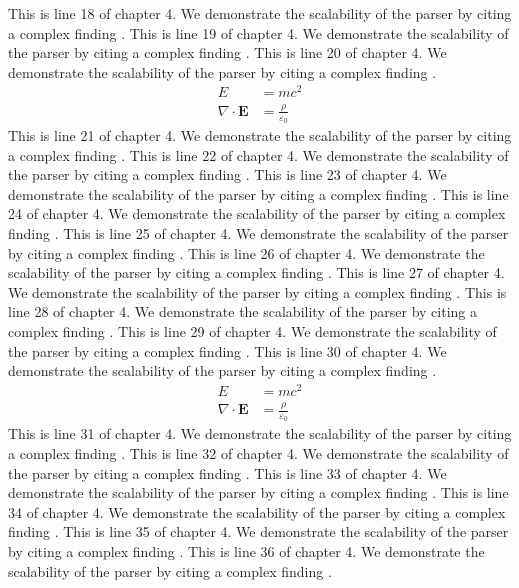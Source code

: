 This is line 18 of chapter 4. We demonstrate the scalability of the parser by citing a complex finding \cite{ref4_18}.
This is line 19 of chapter 4. We demonstrate the scalability of the parser by citing a complex finding \cite{ref4_19}.
This is line 20 of chapter 4. We demonstrate the scalability of the parser by citing a complex finding \cite{ref4_20}.
\begin{align*}
  E &= mc^2 \\
  \nabla \cdot \mathbf{E} &= \frac{\rho}{\varepsilon_0}
\end{align*}
This is line 21 of chapter 4. We demonstrate the scalability of the parser by citing a complex finding \cite{ref4_21}.
This is line 22 of chapter 4. We demonstrate the scalability of the parser by citing a complex finding \cite{ref4_22}.
This is line 23 of chapter 4. We demonstrate the scalability of the parser by citing a complex finding \cite{ref4_23}.
This is line 24 of chapter 4. We demonstrate the scalability of the parser by citing a complex finding \cite{ref4_24}.
This is line 25 of chapter 4. We demonstrate the scalability of the parser by citing a complex finding \cite{ref4_25}.
This is line 26 of chapter 4. We demonstrate the scalability of the parser by citing a complex finding \cite{ref4_26}.
This is line 27 of chapter 4. We demonstrate the scalability of the parser by citing a complex finding \cite{ref4_27}.
This is line 28 of chapter 4. We demonstrate the scalability of the parser by citing a complex finding \cite{ref4_28}.
This is line 29 of chapter 4. We demonstrate the scalability of the parser by citing a complex finding \cite{ref4_29}.
This is line 30 of chapter 4. We demonstrate the scalability of the parser by citing a complex finding \cite{ref4_30}.
\begin{align*}
  E &= mc^2 \\
  \nabla \cdot \mathbf{E} &= \frac{\rho}{\varepsilon_0}
\end{align*}
This is line 31 of chapter 4. We demonstrate the scalability of the parser by citing a complex finding \cite{ref4_31}.
This is line 32 of chapter 4. We demonstrate the scalability of the parser by citing a complex finding \cite{ref4_32}.
This is line 33 of chapter 4. We demonstrate the scalability of the parser by citing a complex finding \cite{ref4_33}.
This is line 34 of chapter 4. We demonstrate the scalability of the parser by citing a complex finding \cite{ref4_34}.
This is line 35 of chapter 4. We demonstrate the scalability of the parser by citing a complex finding \cite{ref4_35}.
This is line 36 of chapter 4. We demonstrate the scalability of the parser by citing a complex finding \cite{ref4_36}.
